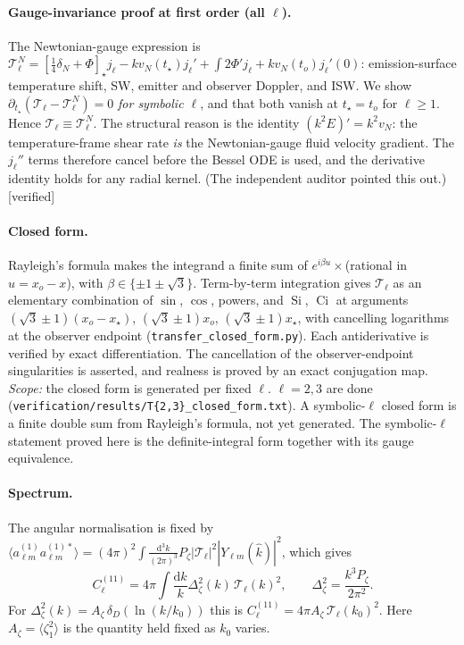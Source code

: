 \documentclass[11pt]{article}
\theoremstyle{definition}
\theoremstyle{remark}
\newcommand{\dd}{\mathrm{d}}
\newcommand{\ens}[1]{\langle #1\rangle}
\newcommand{\status}[1]{\textsf{[#1]}}
\begin{document}
\paragraph{Gauge-invariance proof at first order (all $\ell$).} The
Newtonian-gauge expression is
$\mathcal T^N_\ell=[\tfrac14\delta_N+\Phi]_\star j_\ell-kv_N(t_\star)j_\ell'
+\int2\Phi'j_\ell+kv_N(t_o)j_\ell'(0)$: emission-surface temperature shift,
SW, emitter and observer Doppler, and ISW. We show
$\partial_{t_\star}(\mathcal T_\ell-\mathcal T^N_\ell)=0$ \emph{for symbolic
$\ell$}, and that both vanish at $t_\star=t_o$ for $\ell\ge1$. Hence
$\mathcal T_\ell\equiv\mathcal T^N_\ell$. The structural reason is the
identity $(k^2E)'=k^2v_N$: the temperature-frame shear rate \emph{is} the
Newtonian-gauge fluid velocity gradient. The $j_\ell''$ terms therefore cancel
before the Bessel ODE is used, and the derivative identity holds for any
radial kernel. (The independent auditor pointed this out.)
\status{verified}

\paragraph{Closed form.} Rayleigh's formula makes the integrand a finite sum
of $e^{i\beta u}\times$(rational in $u=x_o-x$), with
$\beta\in\{\pm1\pm\sqrt3\}$. Term-by-term integration gives
$\mathcal T_\ell$ as an elementary combination of $\sin$, $\cos$, powers,
and $\operatorname{Si}$, $\operatorname{Ci}$ at arguments
$(\sqrt3\pm1)(x_o-x_\star)$, $(\sqrt3\pm1)x_o$, $(\sqrt3\pm1)x_\star$, with
cancelling logarithms at the observer endpoint
(\texttt{transfer\_closed\_form.py}). Each antiderivative is verified by exact
differentiation. The cancellation of the observer-endpoint singularities is
asserted, and realness is proved by an exact conjugation map.
\emph{Scope:} the closed form is generated per fixed $\ell$. $\ell=2,3$ are
done (\texttt{verification/results/T\{2,3\}\_closed\_form.txt}). A
symbolic-$\ell$ closed form is a finite double sum from Rayleigh's formula,
not yet generated. The symbolic-$\ell$ statement proved here is the
definite-integral form together with its gauge equivalence.

\paragraph{Spectrum.} The angular normalisation is fixed by
$\ens{a^{(1)}_{\ell m}a^{(1)*}_{\ell m}}=(4\pi)^2\!\int\!\frac{\dd^3k}{(2\pi)^3}P_\zeta|\mathcal T_\ell|^2|Y_{\ell m}(\hat k)|^2$, which gives
\[
C^{(11)}_\ell=4\pi\int\frac{\dd k}{k}\Delta^2_\zeta(k)\,\mathcal T_\ell(k)^2,\qquad
\Delta^2_\zeta=\frac{k^3P_\zeta}{2\pi^2}.
\]
For $\Delta^2_\zeta(k)=A_\zeta\,\delta_D(\ln(k/k_0))$ this is
$C^{(11)}_\ell=4\pi A_\zeta\,\mathcal T_\ell(k_0)^2$. Here
$A_\zeta=\ens{\zeta_1^2}$ is the quantity held fixed as $k_0$ varies.
\end{document}
